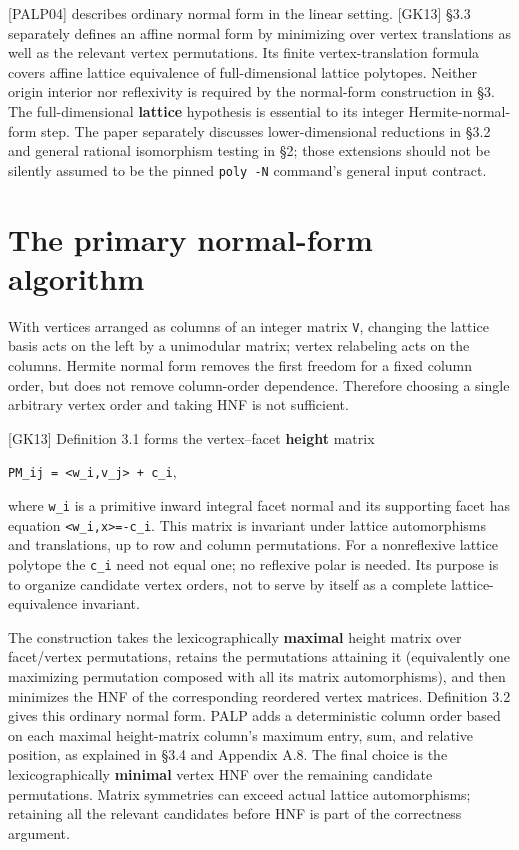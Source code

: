 \documentclass[11pt,a4paper,oneside]{report}
\begin{document}
{[}PALP04{]} describes ordinary normal form in the linear setting.
{[}GK13{]} §3.3 separately defines an affine normal form by minimizing
over vertex translations as well as the relevant vertex permutations.
Its finite vertex-translation formula covers affine lattice equivalence
of full-dimensional lattice polytopes. Neither origin interior nor
reflexivity is required by the normal-form construction in §3. The
full-dimensional \textbf{lattice} hypothesis is essential to its integer
Hermite-normal-form step. The paper separately discusses
lower-dimensional reductions in §3.2 and general rational isomorphism
testing in §2; those extensions should not be silently assumed to be the
pinned \texttt{poly -\allowbreak{}N} command's general input contract.

\section{The primary normal-form
algorithm}\label{normal-forms-and-classification--the-primary-normal-form-algorithm}

With vertices arranged as columns of an integer matrix \texttt{V},
changing the lattice basis acts on the left by a unimodular matrix;
vertex relabeling acts on the columns. Hermite normal form removes the
first freedom for a fixed column order, but does not remove column-order
dependence. Therefore choosing a single arbitrary vertex order and
taking HNF is not sufficient.

{[}GK13{]} Definition 3.1 forms the vertex--facet \textbf{height} matrix

\texttt{PM\_\allowbreak{}ij =\allowbreak{} <w\_\allowbreak{}i,\allowbreak{}v\_\allowbreak{}j> + c\_\allowbreak{}i},

where \texttt{w\_\allowbreak{}i} is a primitive inward integral facet
normal and its supporting facet has equation
\texttt{<w\_\allowbreak{}i,\allowbreak{}x>=\allowbreak{}-\allowbreak{}c\_\allowbreak{}i}.
This matrix is invariant under lattice automorphisms and translations,
up to row and column permutations. For a nonreflexive lattice polytope
the \texttt{c\_\allowbreak{}i} need not equal one; no reflexive polar is
needed. Its purpose is to organize candidate vertex orders, not to serve
by itself as a complete lattice-equivalence invariant.

The construction takes the lexicographically \textbf{maximal} height
matrix over facet/vertex permutations, retains the permutations
attaining it (equivalently one maximizing permutation composed with all
its matrix automorphisms), and then minimizes the HNF of the
corresponding reordered vertex matrices. Definition 3.2 gives this
ordinary normal form. PALP adds a deterministic column order based on
each maximal height-matrix column's maximum entry, sum, and relative
position, as explained in §3.4 and Appendix A.8. The final choice is the
lexicographically \textbf{minimal} vertex HNF over the remaining
candidate permutations. Matrix symmetries can exceed actual lattice
automorphisms; retaining all the relevant candidates before HNF is part
of the correctness argument.
\end{document}
